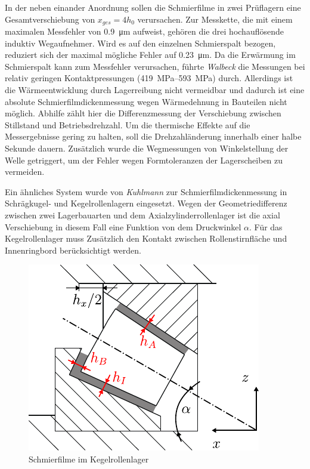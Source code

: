 In der neben einander Anordnung sollen die Schmierfilme in zwei Prüflagern eine Gesamtverschiebung von $x_{ges} = 4 h_0$ verursachen.
Zur Messkette, die mit einem maximalen Messfehler von \SI{0,9}{\micro\meter} aufweist, gehören die drei hochauflösende induktiv Wegaufnehmer.
Wird es auf den einzelnen Schmierspalt bezogen, reduziert sich der maximal mögliche Fehler auf \SI{0,23}{\micro\meter}.
Da die Erwärmung im Schmierspalt kann zum Messfehler verursachen, führte \textit{Walbeck} die Messungen bei relativ geringen Kontaktpressungen (\SIrange{419}{593}{\mega\pascal}) durch.
Allerdings ist die Wärmeentwicklung durch Lagerreibung nicht vermeidbar und dadurch ist eine absolute Schmierfilmdickenmessung wegen Wärmedehnung in Bauteilen nicht möglich.
Abhilfe zählt hier die Differenzmessung der Verschiebung zwischen Stillstand und Betriebsdrehzahl.
Um die thermische Effekte auf die Messergebnisse gering zu halten, soll die Drehzahländerung innerhalb einer halbe Sekunde dauern.
Zusätzlich wurde die Wegmessungen von Winkelstellung der Welle getriggert, um der Fehler wegen Formtoleranzen der Lagerscheiben zu vermeiden.

Ein ähnliches System wurde von \textit{Kuhlmann} \cite{kuhlmann_2009} zur Schmierfilmdickenmessung in Schrägkugel- und Kegelrollenlagern eingesetzt.
Wegen der Geometriedifferenz zwischen zwei Lagerbauarten und dem Axialzylinderrollenlager ist die axial Verschiebung in diesem Fall eine Funktion von dem Druckwinkel $\alpha$.
Für das Kegelrollenlager muss Zusätzlich den Kontakt zwischen Rollenstirnfläche und Innenringbord berücksichtigt werden.
\begin{figure}[htb]
    \centering
    \includegraphics[]{./images/kerola_kuhlmann.pdf}
    \caption{Schmierfilme im Kegelrollenlager \cite{kuhlmann_2009}}
    \label{fig:kerola_kuhlmann}
\end{figure}
%

